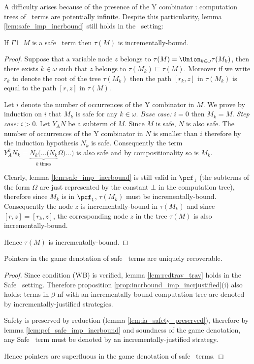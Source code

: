 A difficulty arises because of the presence of the Y combinator : computation trees of \pcf\ terms are potentially infinite.
Despite this particularity, lemma \ref{lem:safe_imp_incrbound} still holds in the \pcf\ setting:
\begin{lem}
\label{lem:pcf_safe_imp_incrbound}
If $\Gamma \vdash M$ is a safe \pcf\ term then $\tau(M)$ is incrementally-bound.
\end{lem}
\begin{proof}
Suppose that a variable node $z$ belongs to $\tau(M) = \Union_{k\in\omega} \tau(M_k)$, then there exists $k\in \omega$
such that $z$ belongs to $\tau(M_k) \sqsubseteq \tau(M)$.
Moreover if we write $r_k$ to denote the root of the tree $\tau(M_k)$ then the path $[r_k,z]$ in $\tau(M_k)$
is equal to the path $[r,z]$ in $\tau(M)$.

Let $i$ denote the number of occurrences of the Y combinator in $M$. We prove by induction on $i$ that $M_k$ is
safe for any $k\in \omega$.
\emph{Base case:} $i=0$ then $M_k = M$.
\emph{Step case:} $i>0$. Let $Y_A N$ be a subterm of $M$.
Since $M$ is safe, $N$ is also safe. The number of occurrences of the Y combinator in $N$ is smaller than $i$ therefore
by the induction hypothesis $N_k$ is safe. Consequently the term $Y_A^k N_k = \underbrace{N_k ( \ldots ( N_k}_{k \mbox{ times}} \Omega ) \ldots )$ is
also safe and by compositionality so is $M_k$.

Clearly, lemma \ref{lem:safe_imp_incrbound} is still valid in
$\pcf_1$ (the subterms of the form $\Omega$ are just represented by
the constant $\bot$ in the computation tree), therefore since $M_k$
is in $\pcf_1$, $\tau(M_k)$ must be incrementally-bound.
Consequently the node $z$ is incrementally-bound in $\tau(M_k)$ and
since $[r,z]=[r_k,z]$, the corresponding node $z$ in the tree
$\tau(M)$ is also incrementally-bound.

Hence $\tau(M)$ is incrementally-bound.
\end{proof}

\begin{thm}
Pointers in the game denotation of safe \pcf\ terms are uniquely recoverable.
\end{thm}
\begin{proof}
Since condition (WB) is verified, lemma \ref{lem:redtrav_trav} holds in the Safe \pcf\ setting. Therefore
proposition \ref{prop:incrbound_imp_incrjustified}(i) also holds: terms in $\beta$-nf
with an incrementally-bound computation tree are denoted by incrementally-justified strategies.

Safety is preserved by reduction (lemma \ref{lem:ia_safety_preserved}), therefore
by lemma \ref{lem:pcf_safe_imp_incrbound} and soundness of the game denotation, any Safe \pcf\ term must be
denoted by an incrementally-justified strategy.

Hence pointers are superfluous in the game denotation of safe \pcf\ terms.
\end{proof}

